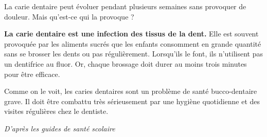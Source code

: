 \documentclass[a4paper,10pt]{article}
\begin{document}

\vspace{-3pt}

\vspace{-2pt}

\vspace{1pt}

\begin{tcolorbox}[
  enhanced,
  colback=primarylight!40,
  colframe=primary,
  arc=2mm,boxrule=0.8pt,
  top=5pt,bottom=5pt,left=8pt,right=8pt,
  title={\small\textbf{\textcolor{white}{\faFileMedical\ Texte : Les caries dentaires (Manuel p. 26)}}},
  coltitle=white,colbacktitle=primary
]
{\small
La carie dentaire peut évoluer pendant plusieurs semaines sans provoquer de douleur. Mais qu'est-ce qui la provoque ?

\textbf{La carie dentaire est une infection des tissus de la dent.} Elle est souvent provoquée par les aliments sucrés que les enfants consomment en grande quantité sans se brosser les dents ou pas régulièrement. Lorsqu'ils le font, ils n'utilisent pas un dentifrice au fluor. Or, chaque brossage doit durer au moins trois minutes pour être efficace.

Comme on le voit, les caries dentaires sont un problème de santé bucco-dentaire grave. Il doit être combattu très sérieusement par une hygiène quotidienne et des visites régulières chez le dentiste.

\hfill\textit{\footnotesize D'après les guides de santé scolaire}
}
\end{tcolorbox}

\vspace{3pt}
\end{document}
